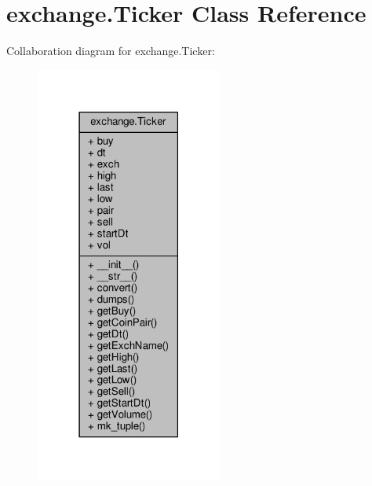 \hypertarget{classexchange_1_1_ticker}{}\section{exchange.\+Ticker Class Reference}
\label{classexchange_1_1_ticker}


Collaboration diagram for exchange.\+Ticker\+:
\nopagebreak
\begin{figure}[H]
\begin{center}
\leavevmode
\includegraphics[width=174pt]{classexchange_1_1_ticker__coll__graph}
\end{center}
\end{figure}
